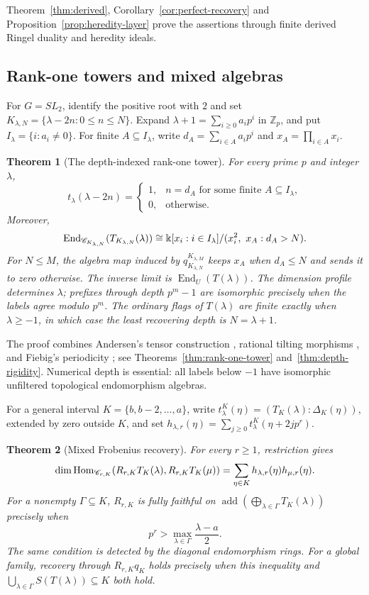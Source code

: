 \documentclass[11pt,reqno]{amsart}
\newcommand{\kk}{\Bbbk}\newcommand{\ZZ}{\mathbb Z}\newcommand{\NN}{\mathbb N}
\newcommand{\Hom}{\operatorname{Hom}}\newcommand{\End}{\operatorname{End}}\newcommand{\Ext}{\operatorname{Ext}}
\newcommand{\add}{\operatorname{add}}\newcommand{\im}{\operatorname{im}}\newcommand{\coker}{\operatorname{coker}}\newcommand{\rad}{\operatorname{rad}}
\newtheorem{theorem}{Theorem}[section]
\theoremstyle{definition}
\theoremstyle{remark}
\numberwithin{equation}{section}
\begin{document}
Theorem~\ref{thm:derived}, Corollary~\ref{cor:perfect-recovery} and
Proposition~\ref{prop:heredity-layer} prove the assertions through
finite derived Ringel duality and heredity ideals. 

\subsection{Rank-one towers and mixed algebras}
For $G=SL_2$, identify the positive root with $2$ and set
$K_{\lambda,N}=\{\lambda-2n:0\leq n\leq N\}$.
Expand $\lambda+1=\sum_{i\geq0}a_ip^i$ in $\ZZ_p$, and put
$I_\lambda=\{i:a_i\ne0\}$. For finite $A\subseteq I_\lambda$, write
$d_A=\sum_{i\in A}a_ip^i$ and $x_A=\prod_{i\in A}x_i$.

\begin{theorem}[The depth-indexed rank-one tower]\label{thm:intro-rank-one}
For every prime $p$ and integer $\lambda$,
\[
 t_\lambda(\lambda-2n)=
 \begin{cases}
 1,&n=d_A\text{ for some finite }A\subseteq I_\lambda,\\
 0,&\text{otherwise}.
 \end{cases}
\]
Moreover,
\[
 \End_{\CC_{K_{\lambda,N}}}(T_{K_{\lambda,N}}(\lambda))
 \cong
 \kk[x_i:i\in I_\lambda]/(x_i^2,\ x_A:d_A>N).
\]
For $N\leq M$, the algebra map induced by $q_{K_{\lambda,N}}^{K_{\lambda,M}}$
keeps $x_A$ when $d_A\leq N$ and sends it to zero otherwise.
The inverse limit is $\End_U(T(\lambda))$.
The dimension profile determines $\lambda$; prefixes through depth
$p^m-1$ are isomorphic precisely when the labels agree modulo $p^m$.
The ordinary flags of $T(\lambda)$ are finite exactly when
$\lambda\geq-1$, in which case the least recovering depth is
$N=\lambda+1$.
\end{theorem}

The proof combines Andersen's tensor construction \cite{Andersen},
rational tilting morphisms \cite{TW}, and Fiebig's periodicity
\cite{Fiebig}; see Theorems~\ref{thm:rank-one-tower}
and~\ref{thm:depth-rigidity}. Numerical depth is essential:
all labels below $-1$ have isomorphic unfiltered topological
endomorphism algebras.

For a general interval $K=\{b,b-2,\ldots,a\}$, write
$t^K_\lambda(\eta)=(T_K(\lambda):\Delta_K(\eta))$, extended by zero
outside $K$, and set
$h_{\lambda,r}(\eta)=\sum_{j\geq0}t^K_\lambda(\eta+2jp^r)$.

\begin{theorem}[Mixed Frobenius recovery]\label{thm:intro-mixed}
For every $r\geq1$, restriction gives
\[
 \dim\Hom_{\CC_{r,K}}(R_{r,K}T_K(\lambda),R_{r,K}T_K(\mu))
       =\sum_{\eta\in K}h_{\lambda,r}(\eta)h_{\mu,r}(\eta).
\]
For a nonempty $\Gamma\subseteq K$, $R_{r,K}$ is fully faithful on
$\add(\bigoplus_{\lambda\in\Gamma}T_K(\lambda))$ precisely when
\[
 p^r>\max_{\lambda\in\Gamma}\frac{\lambda-a}{2}.
\]
The same condition is detected by the diagonal endomorphism rings.
For a global family, recovery through $R_{r,K}q_K$
holds precisely when this inequality and
$\bigcup_{\lambda\in\Gamma}S(T(\lambda))\subseteq K$ both hold.
\end{theorem}
\end{document}

